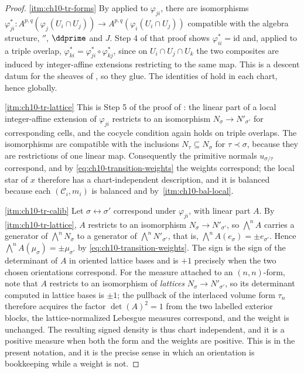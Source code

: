 \begin{proof}
\cref{itm:ch10-tr-forms}
By  applied to $\varphi_{ji}$,
there are isomorphisms
$\varphi_{ji}^*:A^{p,q}(\varphi_j(U_i\cap U_j))\to
A^{p,q}(\varphi_i(U_i\cap U_j))$ compatible with the algebra structure,
$\dprime$, $\ddprime$ and $J$.  Step 4 of that proof shows
$\varphi_{ii}^*=\mathrm{id}$ and, applied to a triple overlap,
$\varphi_{ki}^*=\varphi_{ji}^*\circ\varphi_{kj}^*$, since on
$U_i\cap U_j\cap U_k$ the two composites are induced by integer-affine
extensions restricting to the same map.  This is a descent datum for the
sheaves of , so they glue.  The identities of
 hold in each chart, hence
globally.

\cref{itm:ch10-tr-lattice}
This is Step 5 of the proof of
: the linear part of a local
integer-affine extension of $\varphi_{ji}$ restricts to an isomorphism
$N_{\sigma}\to N'_{\sigma'}$ for corresponding cells, and the cocycle
condition again holds on triple overlaps.  The isomorphisms are compatible
with the inclusions $N_\tau\subseteq N_\sigma$ for $\tau\prec\sigma$, because
they are restrictions of one linear map.  Consequently the primitive normals
$u_{\sigma/\tau}$ correspond, and by \eqref{eq:ch10-transition-weights} the
weights correspond; the local star of $x$ therefore has a chart-independent
description, and it is balanced because each $(\mathscr C_i,m_i)$ is
balanced and by
\,\cref{itm:ch10-bal-local}.

\cref{itm:ch10-tr-calib}
Let $\sigma\leftrightarrow\sigma'$ correspond under $\varphi_{ji}$, with
linear part $A$.  By \cref{itm:ch10-tr-lattice}, $A$ restricts to an
isomorphism $N_\sigma\to N'_{\sigma'}$, so
$\bigwedge^nA$ carries a generator of $\bigwedge^nN_\sigma$ to a generator of
$\bigwedge^nN'_{\sigma'}$, that is,
$\bigwedge^nA(e_\sigma)=\pm e_{\sigma'}$.  Hence
$\bigwedge^nA(\mu_\sigma)=\pm\mu_{\sigma'}$ by
\eqref{eq:ch10-transition-weights}.  The sign is the sign of the determinant
of $A$ in oriented lattice bases and is $+1$ precisely when the two chosen
orientations correspond.  For the measure attached to an $(n,n)$-form, note
that $A$ restricts to an isomorphism of \emph{lattices}
$N_\sigma\to N'_{\sigma'}$, so its determinant computed in lattice bases is
$\pm1$; the pullback of the interlaced volume form $\tau_n$ therefore
acquires the factor $\det(A)^2=1$ from the two labelled exterior blocks, the
lattice-normalized Lebesgue measures correspond, and the weight is
unchanged.  The resulting signed density is thus chart independent, and it
is a positive measure when both the form and the weights are positive. This is
 in the present notation, and it is the
precise sense in which an orientation is bookkeeping while a weight is not.


\end{proof}
